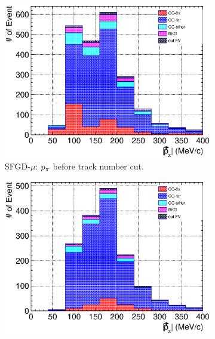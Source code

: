 \begin{figure}
\begin{subfigure}[!htb]{\dbfigwid\textwidth}
                  \label{subfig:tlpi-tpi-af-trknumcut-tpc}
             \end{subfigure}
             \\
             \begin{subfigure}[!htb]{\dbfigwid\textwidth}
                  \includegraphics[width=\textwidth]{figures/sel/SFGmu_p_pi_stack_al8.eps}
                  \caption{SFGD-$\mu$: $p_{\pi}$ before track number cut.}
                  \label{subfig:tlpi-ppi-bf-trknumcut-sfg}
             \end{subfigure}
             \begin{subfigure}[!htb]{\dbfigwid\textwidth}
                  \includegraphics[width=\textwidth]{figures/sel/SFGmu_p_pi_stack_al9.eps}

\end{subfigure}
\end{figure}
